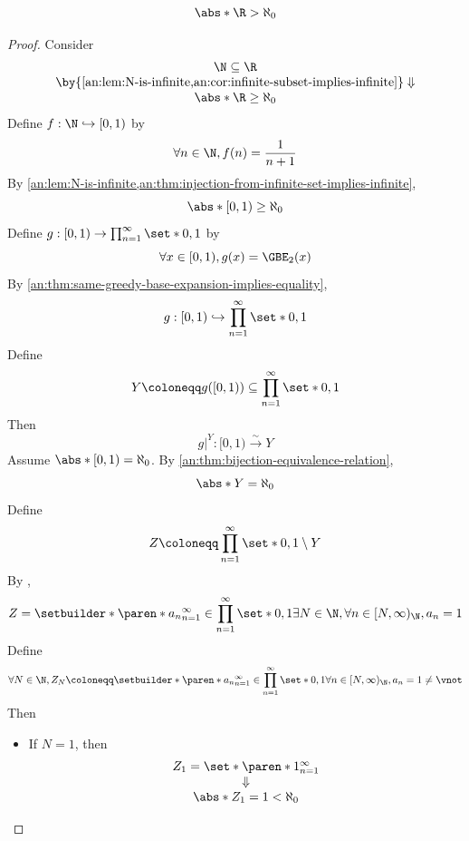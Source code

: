 \bigskip

\begin{theorem} \label{an:thm:R-is-uncountable}
  \[
    \abs*{\R} > \aleph_{0}
  \]
\end{theorem}

\begin{proof}
  Consider
  \[
    \begin{array}{c}
      \N \subseteq \R                                                                     \\
      \by{\Cref{an:lem:N-is-infinite,an:cor:infinite-subset-implies-infinite}} \Downarrow \\
      \abs*{\R} \geq \aleph_{0}
    \end{array}
  \]
  Define $f: \N \hookrightarrow [0, 1)$ by
  \[
    \forall n \in \N, f(n) = \frac{1}{n + 1}
  \]
  By \cref{an:lem:N-is-infinite,an:thm:injection-from-infinite-set-implies-infinite},
  \[
    \abs*{[0, 1)} \geq \aleph_{0}
  \]
  Define $g: [0, 1) \to \prod_{n = 1}^{\infty} \set*{0, 1}$ by
  \[
    \forall x \in [0, 1), g(x) = \GBE_{2}(x)
  \]
  By \cref{an:thm:same-greedy-base-expansion-implies-equality},
  \[
    g: [0, 1) \hookrightarrow \prod_{n = 1}^{\infty} \set*{0, 1}
  \]
  Define
  \[
    Y \coloneqq g([0, 1)) \subseteq \prod_{n = 1}^{\infty} \set*{0, 1}
  \]
  Then
  \[
    g|^{Y}: [0, 1) \xrightarrow{\sim} Y
  \]
  Assume $\abs*{[0, 1)} = \aleph_{0}$. By \cref{an:thm:bijection-equivalence-relation},
  \[
    \abs*{Y} = \aleph_{0}
  \]
  Define
  \[
    Z \coloneqq \prod_{n = 1}^{\infty} \set*{0, 1} \setminus Y
  \]
  By
  ,
  \[
    Z = \setbuilder*{\paren*{a_{n}}_{n = 1}^{\infty} \in \prod_{n = 1}^{\infty}
    \set*{0, 1}}{\exists N \in \N, \forall n \in [N, \infty)_{\N}, a_{n} = 1}
  \]
  Define
  \[
    \forall N \in \N, Z_{N} \coloneqq \setbuilder*{\paren*{a_{n}}_{n = 1}^{\infty} \in
    \prod_{n = 1}^{\infty} \set*{0, 1}}{\forall n \in [N, \infty)_{\N}, a_{n} = 1} \neq \vnot
  \]
  Then
  \begin{itemize}
    \item If $N = 1$, then
          \[
            \begin{array}{c}
              Z_{1} = \set*{\paren*{1}_{n = 1}^{\infty}} \\
              \Downarrow                                 \\
              \abs*{Z_{1}} = 1 < \aleph_{0}
            \end{array}
\]
\end{itemize}
\end{proof}
